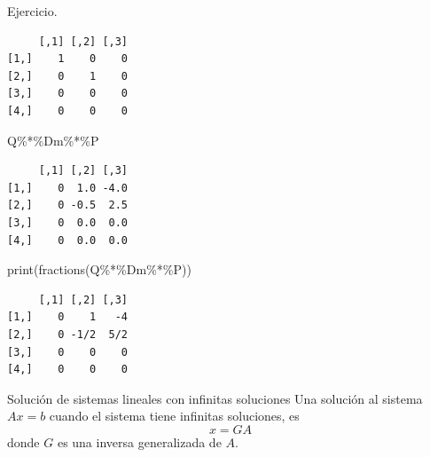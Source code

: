 \documentclass[
  ignorenonframetext,
  aspectratio=169,
  spanish,
]{beamer}
\newenvironment{Shaded}{\begin{snugshade}}{\end{snugshade}}
\newcommand{\FunctionTok}[1]{\textcolor[rgb]{0.28,0.35,0.67}{#1}}
\newcommand{\NormalTok}[1]{\textcolor[rgb]{0.00,0.23,0.31}{#1}}
\newcommand{\SpecialCharTok}[1]{\textcolor[rgb]{0.37,0.37,0.37}{#1}}
\begin{document}
\begin{frame}[fragile]{}
\begin{block}{Ejercicio.}
\begin{verbatim}
     [,1] [,2] [,3]
[1,]    1    0    0
[2,]    0    1    0
[3,]    0    0    0
[4,]    0    0    0
\end{verbatim}

\begin{Shaded}
\begin{Highlighting}[]
\NormalTok{Q}\SpecialCharTok{\%*\%}\NormalTok{Dm}\SpecialCharTok{\%*\%}\NormalTok{P}
\end{Highlighting}
\end{Shaded}

\begin{verbatim}
     [,1] [,2] [,3]
[1,]    0  1.0 -4.0
[2,]    0 -0.5  2.5
[3,]    0  0.0  0.0
[4,]    0  0.0  0.0
\end{verbatim}

\begin{Shaded}
\begin{Highlighting}[]
\FunctionTok{print}\NormalTok{(}\FunctionTok{fractions}\NormalTok{(Q}\SpecialCharTok{\%*\%}\NormalTok{Dm}\SpecialCharTok{\%*\%}\NormalTok{P))}
\end{Highlighting}
\end{Shaded}

\begin{verbatim}
     [,1] [,2] [,3]
[1,]    0    1   -4
[2,]    0 -1/2  5/2
[3,]    0    0    0
[4,]    0    0    0
\end{verbatim}
\end{block}
\end{frame}

\begin{frame}{Solución de sistemas lineales con infinitas soluciones}
\label{soluciuxf3n-de-sistemas-lineales-con-infinitas-soluciones}
Una solución al sistema \(Ax=b\) cuando el sistema tiene infinitas
soluciones, es \[x=GA\] donde \(G\) es una inversa generalizada de
\(A\).
\end{frame}
\end{document}
